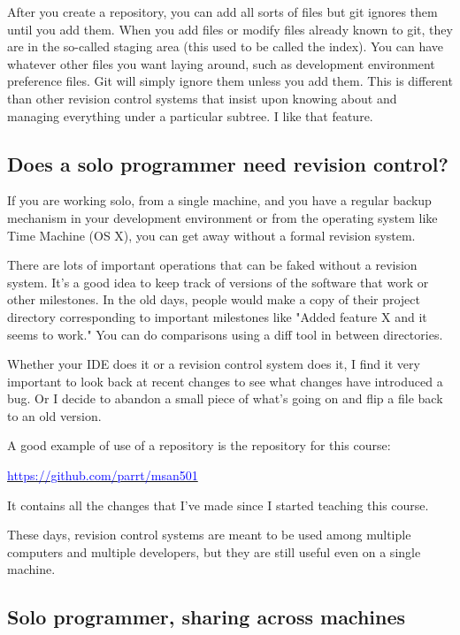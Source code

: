 \begin{fullwidth}
After you create a repository, you can add all sorts of files but git ignores them until you add them. When you add files or modify files already known to git, they are in the so-called staging area (this used to be called the index). You can have whatever other files you want laying around, such as development environment preference files. Git will simply ignore them unless you add them. This is different than other revision control systems that insist upon knowing about and managing everything under a particular subtree. I like that feature.

\subsection{Does a solo programmer need revision control?}

If you are working solo, from a single machine, and you have a regular backup mechanism in your development environment or from the operating system like Time Machine (OS X), you can get away without a formal revision system.

There are lots of important operations that can be faked without a revision system. It's a good idea to keep track of versions of the software that work or other milestones. In the old days, people would make a copy of their project directory corresponding to important milestones like "Added feature X and it seems to work." You can do comparisons using a diff tool in between directories.

Whether your IDE does it or a revision control system does it, I find it very important to look back at recent changes to see what changes have introduced a bug. Or I decide to abandon a small piece of what's going on and flip a file back to an old version.

A good example of use of a repository is the repository for this course:

\href{https://github.com/parrt/msan501}{\textcolor{blue}{https://github.com/parrt/msan501}}

\noindent It contains all the changes that I've made since I started teaching this course.

These days, revision control systems are meant to be used among multiple computers and multiple developers, but they are still useful even on a single machine.

\subsection{Solo programmer, sharing across machines}


\end{fullwidth}
